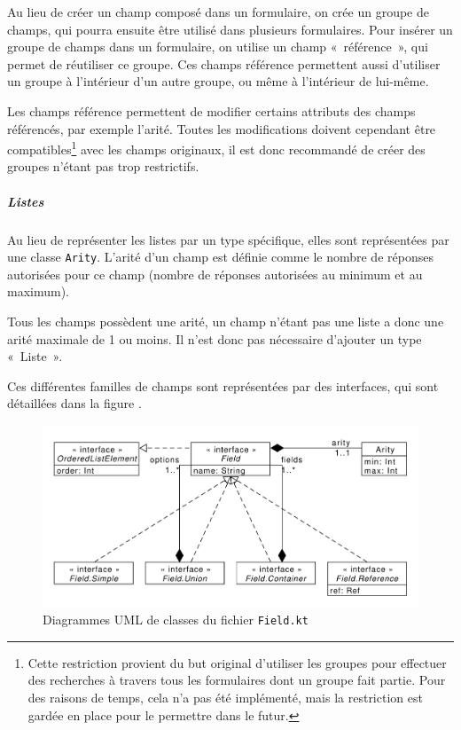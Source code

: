 Au lieu de créer un champ composé dans un formulaire, on crée un groupe de champs, qui pourra ensuite être utilisé dans plusieurs formulaires.
Pour insérer un groupe de champs dans un formulaire, on utilise un champ «~référence~», qui permet de réutiliser ce groupe.
Ces champs référence permettent aussi d'utiliser un groupe à l'intérieur d'un autre groupe, ou même à l'intérieur de lui-même.

Les champs référence permettent de modifier certains attributs des champs référencés, par exemple l'arité.
Toutes les modifications doivent cependant être compatibles\footnote{Cette restriction provient du but original d'utiliser les groupes pour effectuer des recherches à travers tous les formulaires dont un groupe fait partie. Pour des raisons de temps, cela n'a pas été implémenté, mais la restriction est gardée en place pour le permettre dans le futur.} avec les champs originaux, il est donc recommandé de créer des groupes n'étant pas trop restrictifs.

\subparagraph{Listes}
Au lieu de représenter les listes par un type spécifique, elles sont représentées par une classe \lstinline{Arity}.
L'arité d'un champ est définie comme le nombre de réponses autorisées pour ce champ (nombre de réponses autorisées au minimum et au maximum).

Tous les champs possèdent une arité, un champ n'étant pas une liste a donc une arité maximale de 1 ou moins.
Il n'est donc pas nécessaire d'ajouter un type «~Liste~».

\uparagraph
Ces différentes familles de champs sont représentées par des interfaces, qui sont détaillées dans la figure .

\begin{figure}[tp]
	\caption{Diagrammes UML de classes du fichier \lstinline{Field.kt}}
	\label{fig:uml-fields}
	\includegraphics[width=\textwidth]{reports-forms-fields}
\end{figure}

